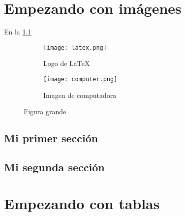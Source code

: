 \documentclass[12pt]{report}
\begin{document}
	\maketitle
	\tableofcontents
	\listoffigures
	\listoftables
	
	
	\printglossary[type=\acronymtype, nonumberlist, title={Abreviaciones y siglas}]
	\printglossary[type=\glsdefaulttype, nonumberlist]
	
	\chapter{Empezando con imágenes}
		
		En la \cref{fig:latex-logo} \lipsum[1][1-11]
	
		\begin{figure}[h]
			\centering
			\begin{subfigure}{0.4\textwidth}
				\centering
				\texttt{[image: latex.png]}
				\caption{Logo de \LaTeX}
				\label{fig:latex-logo}
			\end{subfigure}
			\hfill
			\begin{subfigure}{0.4\textwidth}
				\centering
				\texttt{[image: computer.png]}
				\caption{Imagen de computadora}
				\label{fig:computer-image}
			\end{subfigure}
			\caption{Figura grande}
			\label{fig:grande}
		\end{figure}
		
		\section{Mi primer sección}
			\lipsum[1-2]
			\lipsum[1][1-3] \cite{nadeeshani_nicotinamide_2022}
		
		\section{Mi segunda sección}
			\lipsum[3-5]
			
	\chapter{Empezando con tablas}
		
\end{document}

